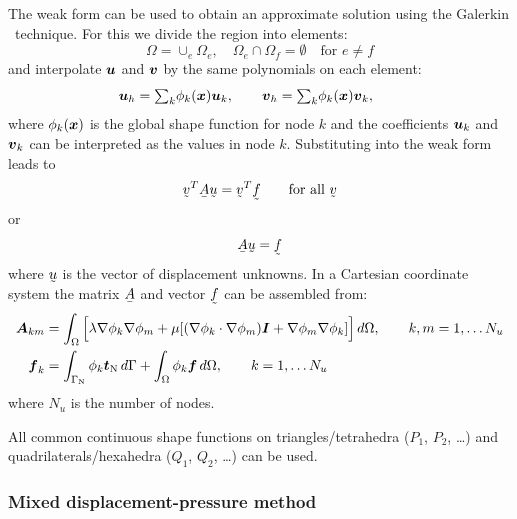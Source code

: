 The weak form can be used to obtain an approximate solution using the Galerkin \fem\
technique. For this we divide the region into elements:
\[
\Omega=\cup_e\Omega_e, \quad\Omega_{e}\cap\Omega_{f}=\emptyset\quad
   \text{for }e\neq f
\]
and interpolate $\boldsymbol{u}$ and  $\boldsymbol{v}$ by the same
polynomials on each element:
\[
    \boldsymbol{u}_h={\textstyle\sum}_k \phi_k(\boldsymbol{x})\boldsymbol{u}_k, \qquad
    \boldsymbol{v}_h={\textstyle\sum}_k \phi_k(\boldsymbol{x})\boldsymbol{v}_k, \qquad
\]
where $\phi_k(\boldsymbol{x})$ is the global shape function for node $k$ and the 
coefficients $\boldsymbol{u}_k$ and $\boldsymbol{v}_k$ can be interpreted
as the values in node $k$.  Substituting into the
weak form leads to
\begin{equation}
 \col{v}^T\mat{A}\col{u}=
    \col{v}^T\col{f}\qquad\text{for all }\col{v}
\end{equation}
or
\begin{equation}
 \mat{A}\col{u}=\col{f}
\end{equation}
where $\col u$ is the vector of displacement unknowns.
In a Cartesian coordinate system the matrix $\mat A$ and vector $\col f$ can be assembled from:
\begin{align}
  \boldsymbol{A}_{km} &= \int_\Omega\Big[\lambda \nabla\phi_k\nabla\phi_m+\mu [(\nabla\phi_k\cdot\nabla\phi_m)\boldsymbol{I}+\nabla\phi_m\nabla\phi_k]\Big]\,d\Omega, \qquad
  k,m=1,\dots N_{u}\label{eq:le_Atensor}\\
  \boldsymbol{f}_k&=\int_{\Gamma_\text{N}}\phi_k\boldsymbol{t}_\text{N}\,d\Gamma
+\int_\Omega \phi_k\boldsymbol{f}\,d\Omega, \qquad k=1,\dots N_{u}\label{eq:le_fvector}
\end{align}
where $N_u$ is the number of nodes.

All common continuous shape functions on triangles/tetrahedra ($P_1$, $P_2$, \ldots) and quadrilaterals/hexahedra ($Q_1$, $Q_2$, \ldots) can be used.

\subsubsection{Mixed displacement-pressure method}

